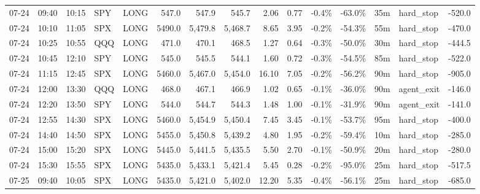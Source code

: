 \documentclass[11pt,a4paper,twoside]{article}
\begin{document}
\begin{landscape}
\begin{center}
\begin{longtable}{>{\color{txtmain}}l l l l l r r r r r r r r >{\color{txtmain}}l r}
07-24 & 09:40 & 10:15 & SPY & LONG & 547.0 & 547.9 & 545.7 & 2.06 & 0.77 & \textcolor{lossred}{-0.4\%} & \textcolor{lossred}{-63.0\%} & 35m & hard\_stop & \textcolor{lossred}{-520.0} \\
07-24 & 10:10 & 11:05 & SPX & LONG & 5490.0 & 5,479.8 & 5,468.7 & 8.65 & 3.95 & \textcolor{lossred}{-0.2\%} & \textcolor{lossred}{-54.3\%} & 55m & hard\_stop & \textcolor{lossred}{-470.0} \\
07-24 & 10:25 & 10:55 & QQQ & LONG & 471.0 & 470.1 & 468.5 & 1.27 & 0.64 & \textcolor{lossred}{-0.3\%} & \textcolor{lossred}{-50.0\%} & 30m & hard\_stop & \textcolor{lossred}{-444.5} \\
07-24 & 10:45 & 12:10 & SPY & LONG & 545.0 & 545.5 & 544.1 & 1.60 & 0.72 & \textcolor{lossred}{-0.3\%} & \textcolor{lossred}{-54.5\%} & 85m & hard\_stop & \textcolor{lossred}{-522.0} \\
07-24 & 11:15 & 12:45 & SPX & LONG & 5460.0 & 5,467.0 & 5,454.0 & 16.10 & 7.05 & \textcolor{lossred}{-0.2\%} & \textcolor{lossred}{-56.2\%} & 90m & hard\_stop & \textcolor{lossred}{-905.0} \\
07-24 & 12:00 & 13:30 & QQQ & LONG & 468.0 & 467.1 & 466.9 & 1.02 & 0.65 & \textcolor{lossred}{-0.1\%} & \textcolor{lossred}{-36.0\%} & 90m & agent\_exit & \textcolor{lossred}{-146.0} \\
07-24 & 12:20 & 13:50 & SPY & LONG & 544.0 & 544.7 & 544.3 & 1.48 & 1.00 & \textcolor{lossred}{-0.1\%} & \textcolor{lossred}{-31.9\%} & 90m & agent\_exit & \textcolor{lossred}{-141.0} \\
07-24 & 12:55 & 14:30 & SPX & LONG & 5460.0 & 5,454.9 & 5,450.4 & 7.45 & 3.45 & \textcolor{lossred}{-0.1\%} & \textcolor{lossred}{-53.7\%} & 95m & hard\_stop & \textcolor{lossred}{-400.0} \\
07-24 & 14:40 & 14:50 & SPX & LONG & 5455.0 & 5,450.8 & 5,439.2 & 4.80 & 1.95 & \textcolor{lossred}{-0.2\%} & \textcolor{lossred}{-59.4\%} & 10m & hard\_stop & \textcolor{lossred}{-285.0} \\
07-24 & 15:00 & 15:20 & SPX & LONG & 5445.0 & 5,441.5 & 5,435.5 & 5.50 & 2.70 & \textcolor{lossred}{-0.1\%} & \textcolor{lossred}{-50.9\%} & 20m & hard\_stop & \textcolor{lossred}{-280.0} \\
07-24 & 15:30 & 15:55 & SPX & LONG & 5435.0 & 5,433.1 & 5,421.4 & 5.45 & 0.28 & \textcolor{lossred}{-0.2\%} & \textcolor{lossred}{-95.0\%} & 25m & hard\_stop & \textcolor{lossred}{-517.5} \\
07-25 & 09:40 & 10:05 & SPX & LONG & 5435.0 & 5,421.0 & 5,402.0 & 12.20 & 5.35 & \textcolor{lossred}{-0.4\%} & \textcolor{lossred}{-56.1\%} & 25m & hard\_stop & \textcolor{lossred}{-685.0} \\

\end{longtable}
\end{center}
\end{landscape}
\end{document}
